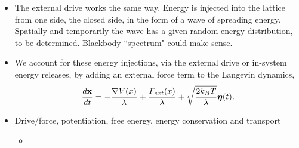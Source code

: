 \documentclass[12pt,letterpaper]{article}
\begin{document}
\begin{itemize}
\item The external drive works the same way. Energy is injected into the lattice from one side, the closed side, in the form of a wave of spreading energy. Spatially and temporarily the wave has a given random energy distribution, to be determined. Blackbody ``spectrum" could make sense.
\item We account for these energy injections, via the external drive or in-system energy releases, by adding an external force term to the Langevin dynamics,
\begin{align*}
{d\mathbf{x} \over dt} = -{\nabla V(x) \over \lambda} + {F_{ext}(x) \over \lambda} + \sqrt{2 k_{B}T\over \lambda}\boldsymbol{\eta}(t).
\end{align*}
\item Drive/force, potentiation, free energy, energy conservation and transport
\begin{itemize}
    \item
\end{itemize}
\end{itemize}
\end{document}
